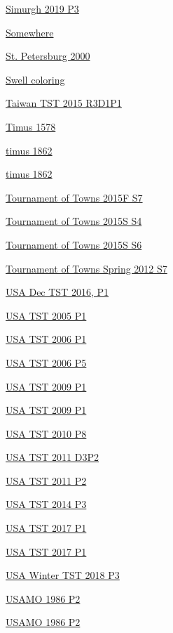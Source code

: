\hyperref  [problem:Simurgh 2019 P3]{Simurgh 2019 P3}

\hyperref  [problem:Somewhere]{Somewhere}

\hyperref  [problem:St. Petersburg 2000]{St. Petersburg 2000}

\hyperref  [problem:Swell coloring]{Swell coloring}

\hyperref  [problem:Taiwan TST 2015 R3D1P1]{Taiwan TST 2015 R3D1P1}

\hyperref  [problem:Timus 1578]{Timus 1578}

\hyperref  [problem:timus 1862]{timus 1862}

\hyperref  [problem:timus 1862]{timus 1862}

\hyperref  [problem:Tournament of Towns 2015F S7]{Tournament of Towns 2015F S7}

\hyperref  [problem:Tournament of Towns 2015S S4]{Tournament of Towns 2015S S4}

\hyperref  [problem:Tournament of Towns 2015S S6]{Tournament of Towns 2015S S6}

\hyperref  [problem:Tournament of Towns Spring 2012 S7]{Tournament of Towns Spring 2012 S7}

\hyperref  [problem:USA Dec TST 2016, P1]{USA Dec TST 2016, P1}

\hyperref  [problem:USA TST 2005 P1]{USA TST 2005 P1}

\hyperref  [problem:USA TST 2006 P1]{USA TST 2006 P1}

\hyperref  [problem:USA TST 2006 P5]{USA TST 2006 P5}

\hyperref  [problem:USA TST 2009 P1]{USA TST 2009 P1}

\hyperref  [problem:USA TST 2009 P1]{USA TST 2009 P1}

\hyperref  [problem:USA TST 2010 P8]{USA TST 2010 P8}

\hyperref  [problem:USA TST 2011 D3P2]{USA TST 2011 D3P2}

\hyperref  [problem:USA TST 2011 P2]{USA TST 2011 P2}

\hyperref  [problem:USA TST 2014 P3]{USA TST 2014 P3}

\hyperref  [problem:USA TST 2017 P1]{USA TST 2017 P1}

\hyperref  [problem:USA TST 2017 P1]{USA TST 2017 P1}

\hyperref  [problem:USA Winter TST 2018 P3]{USA Winter TST 2018 P3}

\hyperref  [problem:USAMO 1986 P2]{USAMO 1986 P2}

\hyperref  [problem:USAMO 1986 P2]{USAMO 1986 P2}


